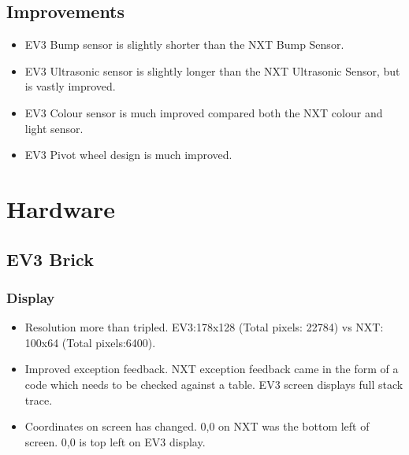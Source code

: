 \documentclass[11pt, a4paper, oneside]{article}
\begin{document}
		
	

		

 		\subsection{Improvements}
 		\begin{itemize}
 		\item EV3 Bump sensor is slightly shorter than the NXT Bump Sensor.
 		\item EV3 Ultrasonic sensor is slightly longer than the NXT Ultrasonic Sensor, but is vastly improved.
 		\item EV3 Colour sensor is much improved compared both the NXT colour and light sensor.
 		\item EV3 Pivot wheel design is much improved.
 		\end{itemize}
 		

 		


		
 		
 		
 		
 		
 		
 		
	\section{Hardware}
	\subsection{EV3 Brick}
		\subsubsection{Display}
		\begin{itemize}
			\item Resolution more than tripled. EV3:178x128 (Total pixels: 22784) vs NXT: 100x64 (Total pixels:6400).
			\item Improved exception feedback. NXT exception feedback came in the form of a code which needs to be checked against a table. EV3 screen displays full stack trace.
			\item Coordinates on screen has changed. 0,0 on NXT was the bottom left of screen. 0,0 is top left on EV3 display.
		\end{itemize}
		
\end{document}
